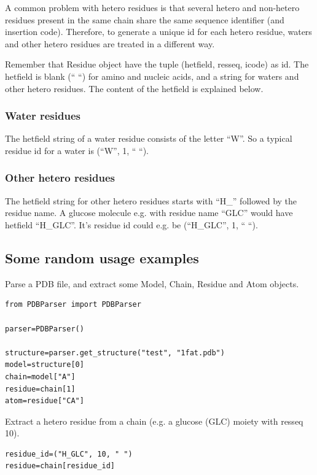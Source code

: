 \documentclass{report}
\begin{document}
A common problem with hetero residues is that several hetero and non-hetero
residues present in the same chain share the same sequence identifier (and insertion
code). Therefore, to generate a unique id for each hetero residue, waters and
other hetero residues are treated in a different way.

Remember that Residue object have the tuple (hetfield, resseq, icode) as id.
The hetfield is blank ({}`` {}``) for amino and nucleic acids, and a string
for waters and other hetero residues. The content of the hetfield is explained
below.

\subsubsection{Water residues}

The hetfield string of a water residue consists of the letter {}``W{}''. So
a typical residue id for a water is ({}``W{}'', 1, {}`` {}``).

\subsubsection{Other hetero residues}

The hetfield string for other hetero residues starts with {}``H\_{}'' followed
by the residue name. A glucose molecule e.g. with residue name {}``GLC{}''
would have hetfield {}``H\_GLC{}''. It's residue id could e.g. be ({}``H\_GLC{}'',
1, {}`` {}``).

\subsection{Some random usage examples}

Parse a PDB file, and extract some Model, Chain, Residue and Atom objects.

\begin{verbatim}
from PDBParser import PDBParser

parser=PDBParser()

structure=parser.get_structure("test", "1fat.pdb")
model=structure[0]
chain=model["A"]
residue=chain[1]
atom=residue["CA"]
\end{verbatim}

Extract a hetero residue from a chain (e.g. a glucose (GLC) moiety with resseq
10).

\begin{verbatim}
residue_id=("H_GLC", 10, " ")
residue=chain[residue_id]
\end{verbatim}
\end{document}
